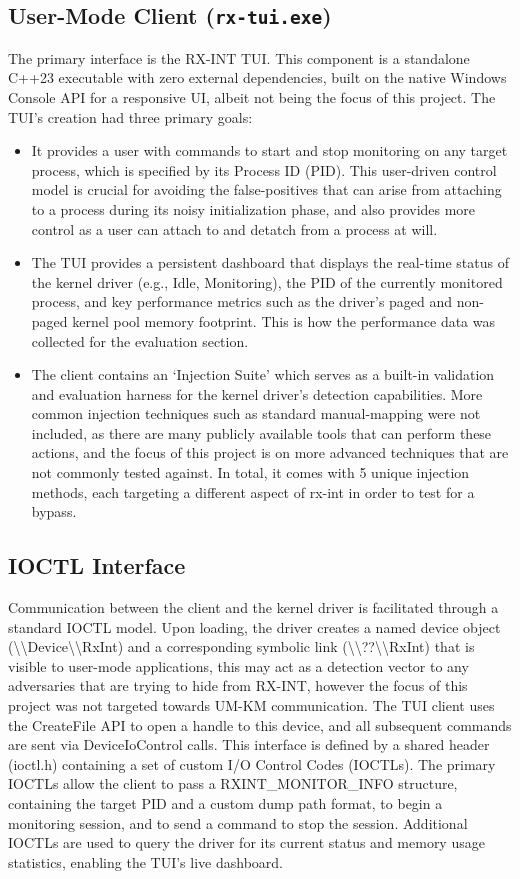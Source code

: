 \documentclass[journal]{IEEEtran}
\begin{document}
\subsection{User-Mode Client (\texttt{rx-tui.exe})}
The primary interface is the RX-INT TUI. This component is a standalone C++23 executable with zero external dependencies, built on the native Windows Console API for a responsive UI, albeit not being the focus of this project. The TUI's creation had three primary goals:
\begin{itemize}
\item It provides a user with commands to start and stop monitoring on any target process, which is specified by its Process ID (PID). This user-driven control model is crucial for avoiding the false-positives that can arise from attaching to a process during its noisy initialization phase, and also provides more control as a user can attach to and detatch from a process at will.
\item The TUI provides a persistent dashboard that displays the real-time status of the kernel driver (e.g., Idle, Monitoring), the PID of the currently monitored process, and key performance metrics such as the driver's paged and non-paged kernel pool memory footprint. This is how the performance data was collected for the evaluation section.
\item The client contains an `Injection Suite' which serves as a built-in validation and evaluation harness for the kernel driver's detection capabilities. More common injection techniques such as standard manual-mapping were not included, as there are many publicly available tools that can perform these actions, and the focus of this project is on more advanced techniques that are not commonly tested against. In total, it comes with 5 unique injection methods, each targeting a different aspect of rx-int in order to test for a bypass.
\end{itemize}
\subsection{IOCTL Interface}
Communication between the client and the kernel driver is facilitated through a standard IOCTL model. Upon loading, the driver creates a named device object (\textbackslash\textbackslash Device\textbackslash\textbackslash RxInt) and a corresponding symbolic link (\textbackslash\textbackslash??\textbackslash\textbackslash RxInt) that is visible to user-mode applications, this may act as a detection vector to any adversaries that are trying to hide from RX-INT, however the focus of this project was not targeted towards UM-KM communication. The TUI client uses the CreateFile API to open a handle to this device, and all subsequent commands are sent via DeviceIoControl calls.
This interface is defined by a shared header (ioctl.h) containing a set of custom I/O Control Codes (IOCTLs). The primary IOCTLs allow the client to pass a RXINT\_MONITOR\_INFO structure, containing the target PID and a custom dump path format, to begin a monitoring session, and to send a command to stop the session. Additional IOCTLs are used to query the driver for its current status and memory usage statistics, enabling the TUI's live dashboard.
\end{document}
